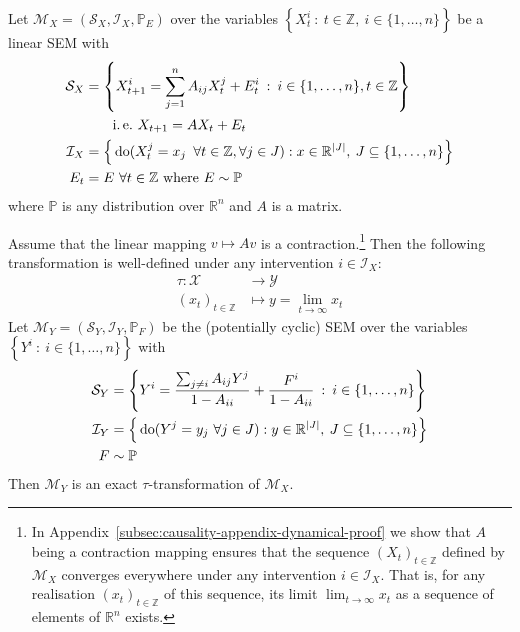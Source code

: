 \begin{theorem}\label{theorem:identical}
Let $\mathcal{M}_X = \left(\mathcal{S}_X, \mathcal{I}_X, \mathbb{P}_{E} \right)$ over the variables ${\left\lbrace X_t^i \: : \: t \in \mathbb{Z}, \: i\in \{1,\ldots,n\} \right\rbrace}$ be a linear SEM with
%
\begin{align*}
\mathcal{S}_X &= \left\lbrace X_{t+1}^i = \sum_{j=1}^n A_{ij}X_t^j + E_t^i \:  : \: i \in \{1,\ldots,n\}, t\in\mathbb{Z} \right\rbrace \\
&\qquad\text{i.\,e.}\ X_{t+1} = AX_t + E_t \\
%
\mathcal{I}_X &= \Big{\{} \doop(X_t^j= x_j \enspace \forall t \in \mathbb{Z},\forall j \in J):  x \in \mathbb{R}^{|J|}, \: J \subseteq \{1,\ldots,n\} \Big{\}} \\
%
E_t &= E\ \forall t\in\mathbb{Z} \text{ where } E \sim \mathbb{P}
\end{align*}
%
where $\mathbb{P}$ is any distribution over $\mathbb{R}^n$ and $A$ is a matrix.

Assume that the linear mapping $v\mapsto Av$ is a contraction.\footnote{In Appendix~\ref{subsec:causality-appendix-dynamical-proof} we show that $A$ being a contraction mapping ensures that the sequence $(X_t)_{t\in\mathbb{Z}}$ defined by $\mathcal{M}_X$ converges everywhere under any intervention $i\in\mathcal{I}_X$. That is, for any realisation $(x_t)_{t\in\mathbb{Z}}$ of this sequence, its limit $\lim_{t\rightarrow \infty}x_t$ as a sequence of elements of $\mathbb{R}^n$ exists.}
Then the following transformation is well-defined under any intervention $i\in\mathcal{I}_X$:
%
\begin{align*}
\tau : \mathcal{X} &\rightarrow \mathcal{Y} \\
(x_t)_{t\in \mathbb{Z}} & \mapsto y= \lim_{t\rightarrow \infty} x_t
\end{align*}
%
Let ${\mathcal{M}_Y = \left(\mathcal{S}_Y, \mathcal{I}_Y, \mathbb{P}_{F} \right)}$ be the (potentially cyclic) SEM over the variables ${\left\lbrace Y^i \: :  \: i\in \{1,\ldots,n\} \right\rbrace}$  with
%
\begin{align*}
\mathcal{S}_Y &= \left\lbrace Y^i = \frac{\sum_{j\not=i} A_{ij}Y^j}{1-A_{ii}} + \frac{F^i}{1-A_{ii}} \:  : \: i \in \{1,\ldots,n\} \right\rbrace \\
%
\mathcal{I}_Y &= \Big{\{} \doop(Y^j= y_j \ \forall j \in J) : y \in \mathbb{R}^{|J|}, \: J \subseteq \{1,\ldots,n\} \Big{\}} \\
%
F &\sim \mathbb{P}
\end{align*}
%
Then $\mathcal{M}_Y$ is an exact $\tau$-transformation of $\mathcal{M}_X$.
\end{theorem}

